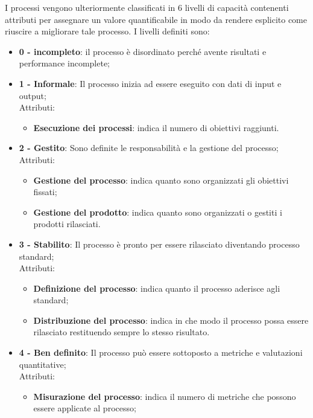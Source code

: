 \documentclass[../piano-di-qualifica.tex]{subfiles}
\begin{document}
I processi vengono ulteriormente classificati in 6 livelli di capacità contenenti attributi per assegnare un valore quantificabile in modo da rendere esplicito come riuscire a migliorare tale processo.
I livelli definiti sono:
\begin{itemize}
    \item \textbf{0 - incompleto}: il processo è disordinato perché avente risultati e performance incomplete;
    \item \textbf{1 - Informale}: Il processo inizia ad essere eseguito con dati di input e output;
       \\ Attributi:
        \begin{itemize}
            \item \textbf{Esecuzione dei processi}: indica il numero di obiettivi raggiunti.
        \end{itemize}
    \item \textbf{2 - Gestito}: Sono definite le responsabilità e la gestione del processo;
        \\ Attributi:
        \begin{itemize}
            \item \textbf{Gestione del processo}: indica quanto sono organizzati gli obiettivi fissati;
            \item \textbf{Gestione del prodotto}: indica quanto sono organizzati o gestiti i prodotti rilasciati.
        \end{itemize}
    \item \textbf{3 - Stabilito}: Il processo è pronto per essere rilasciato diventando processo standard;
        \\ Attributi:
        \begin{itemize}
            \item \textbf{Definizione del processo}: indica quanto il processo aderisce agli standard;
            \item \textbf{Distribuzione del processo}: indica in che modo il processo possa essere rilasciato restituendo sempre lo stesso risultato.
        \end{itemize}
    \item \textbf{4 - Ben definito}: Il processo può essere sottoposto a metriche e valutazioni quantitative;
        \\ Attributi:
        \begin{itemize}
            \item \textbf{Misurazione del processo}: indica il numero di metriche che possono essere applicate al processo;

\end{itemize}
\end{itemize}
\end{document}
